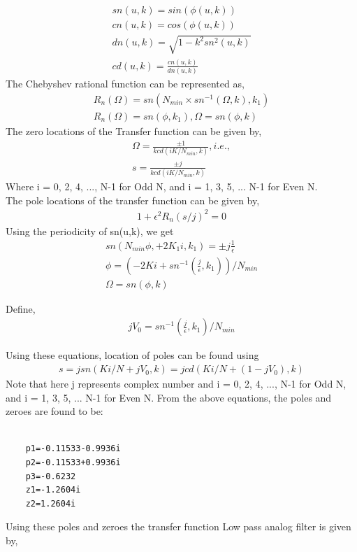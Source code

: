 \documentclass[12pt]{article}
\begin{document}
\begin{gather*}
	sn(u,k) = sin(\phi(u,k))\\
	cn(u,k) = cos(\phi(u,k))\\
	dn(u,k) = \sqrt{1-k^2sn^2(u,k)}\\
	cd(u,k) = \frac{cn(u,k)}{dn(u,k)}
\end{gather*}
The Chebyshev rational function can be represented as,
\begin{gather*}
	R_n(\Omega) = sn(N_{min}\times sn^{-1}(\Omega,k),k_1)\\
	R_n(\Omega) = sn(\phi,k_1), \Omega = sn(\phi,k)
\end{gather*}
The zero locations of the Transfer function can be given by,
\begin{gather*}
	\Omega = \frac{\pm1}{k cd(iK/N_{min},k)}, i.e.,\\
	s = \frac{\pm j}{k cd(iK/N_{min},k)}
\end{gather*}
Where i = 0, 2, 4, ..., N-1 for Odd N, and i = 1, 3, 5, ... N-1 for Even N.\\
The pole locations of the transfer function can be given by,
\begin{gather*}
	1 + \epsilon^2R_n(s/j)^2 = 0
\end{gather*}
Using the periodicity of sn(u,k), we get
\begin{gather*}
	sn(N_{min}\phi, + 2K_1i,k_1) = \pm j\frac{1}{\epsilon}\\
	\phi = (-2Ki + sn^{-1}(\frac{j}{\epsilon},k_1))/N_{min}\\
	\Omega = sn(\phi,k)
\end{gather*}

\noindent Define, 
\begin{gather*}
	jV_0 = sn^{-1}(\frac{j}{\epsilon},k_1)/N_{min}
\end{gather*}

Using these equations, location of poles can be found using
\begin{gather*}
	s = j sn(Ki/N + jV_0,k) = jcd(Ki/N + (1-jV_0),k)
\end{gather*}
Note that here j represents complex number and i = 0, 2, 4, ..., N-1 for Odd N, and i = 1, 3, 5, ... N-1 for Even N.
From the above equations, the poles and zeroes are found to be:
\begin{verbatim}
	
	p1=-0.11533-0.9936i
	p2=-0.11533+0.9936i
	p3=-0.6232
	z1=-1.2604i
	z2=1.2604i 
\end{verbatim}
Using these poles and zeroes the transfer function Low pass analog filter is given by,
\end{document}
